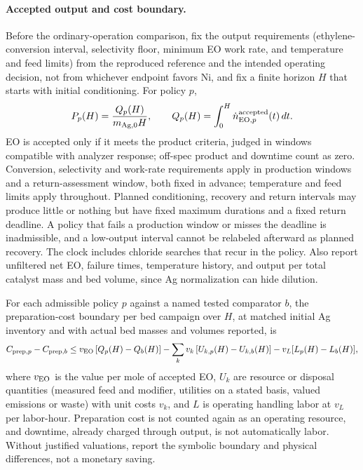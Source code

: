 \paragraph{Accepted output and cost boundary.}
Before the ordinary-operation comparison, fix the output requirements (ethylene-conversion interval, selectivity floor, minimum EO work rate, and temperature and feed limits) from the reproduced reference and the intended operating decision, not from whichever endpoint favors Ni, and fix a finite horizon $H$ that starts with initial conditioning. For policy $p$,
\begin{equation}
 P_p(H)=\frac{Q_p(H)}{m_{{\rm Ag},0}H},\qquad
 Q_p(H)=\int_0^H \dot n_{{\rm EO},p}^{\rm accepted}(t)\,dt.
 \label{eq:ag-productivity}
\end{equation}
EO is accepted only if it meets the product criteria, judged in windows compatible with analyzer response; off-spec product and downtime count as zero. Conversion, selectivity and work-rate requirements apply in production windows and a return-assessment window, both fixed in advance; temperature and feed limits apply throughout. Planned conditioning, recovery and return intervals may produce little or nothing but have fixed maximum durations and a fixed return deadline. A policy that fails a production window or misses the deadline is inadmissible, and a low-output interval cannot be relabeled afterward as planned recovery. The clock includes chloride searches that recur in the policy. Also report unfiltered net EO, failure times, temperature history, and output per total catalyst mass and bed volume, since Ag normalization can hide dilution.

For each admissible policy $p$ against a named tested comparator $b$, the preparation-cost boundary per bed campaign over $H$, at matched initial Ag inventory and with actual bed masses and volumes reported, is
\begin{equation}
 C_{{\rm prep},p}-C_{{\rm prep},b}
 \leq v_{\rm EO}\,[Q_p(H)-Q_b(H)]
 -\sum_k v_k\,[U_{k,p}(H)-U_{k,b}(H)]
 -v_L[L_p(H)-L_b(H)],
 \label{eq:ag-preparation-cost}
\end{equation}
where $v_{\rm EO}$ is the value per mole of accepted EO, $U_k$ are resource or disposal quantities (measured feed and modifier, utilities on a stated basis, valued emissions or waste) with unit costs $v_k$, and $L$ is operating handling labor at $v_L$ per labor-hour. Preparation cost is not counted again as an operating resource, and downtime, already charged through output, is not automatically labor. Without justified valuations, report the symbolic boundary and physical differences, not a monetary saving.

